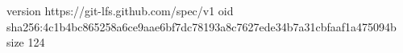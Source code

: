 version https://git-lfs.github.com/spec/v1
oid sha256:4c1b4bc865258a6ce9aae6bf7dc78193a8c7627ede34b7a31cbfaaf1a475094b
size 124
